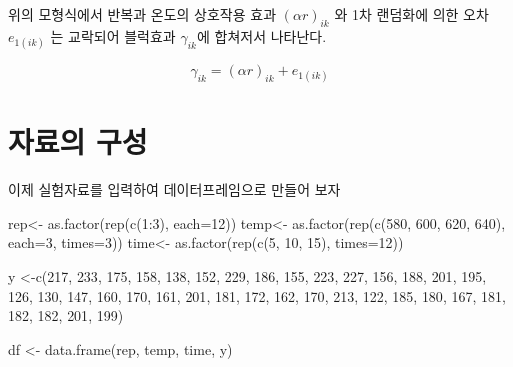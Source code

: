 \documentclass[
]{book}
\newenvironment{Shaded}{\begin{snugshade}}{\end{snugshade}}
\newcommand{\AttributeTok}[1]{\textcolor[rgb]{0.77,0.63,0.00}{#1}}
\newcommand{\DecValTok}[1]{\textcolor[rgb]{0.00,0.00,0.81}{#1}}
\newcommand{\FunctionTok}[1]{\textcolor[rgb]{0.00,0.00,0.00}{#1}}
\newcommand{\NormalTok}[1]{#1}
\newcommand{\OtherTok}[1]{\textcolor[rgb]{0.56,0.35,0.01}{#1}}
\newcommand{\SpecialCharTok}[1]{\textcolor[rgb]{0.00,0.00,0.00}{#1}}
\begin{document}
위의 모형식에서 반복과 온도의 상호작용 효과 \(( \alpha r)_{ik}\) 와 1차 랜덤화에 의한 오차 \(e_{1(ik)}\) 는 교락되어
블럭효과 \(\gamma_{ik}\)에 합쳐저서 나타난다.

\[ \gamma_{ik}  =  (\alpha r)_{ik} + e_{1(ik)}  \]

\hypertarget{uxc790uxb8ccuxc758-uxad6cuxc131-3}{%
\section{자료의 구성}\label{uxc790uxb8ccuxc758-uxad6cuxc131-3}}

이제 실험자료를 입력하여 데이터프레임으로 만들어 보자

\begin{Shaded}
\begin{Highlighting}[]
\NormalTok{rep}\OtherTok{\textless{}{-}} \FunctionTok{as.factor}\NormalTok{(}\FunctionTok{rep}\NormalTok{(}\FunctionTok{c}\NormalTok{(}\DecValTok{1}\SpecialCharTok{:}\DecValTok{3}\NormalTok{), }\AttributeTok{each=}\DecValTok{12}\NormalTok{))}
\NormalTok{temp}\OtherTok{\textless{}{-}} \FunctionTok{as.factor}\NormalTok{(}\FunctionTok{rep}\NormalTok{(}\FunctionTok{c}\NormalTok{(}\DecValTok{580}\NormalTok{, }\DecValTok{600}\NormalTok{, }\DecValTok{620}\NormalTok{, }\DecValTok{640}\NormalTok{), }\AttributeTok{each=}\DecValTok{3}\NormalTok{, }\AttributeTok{times=}\DecValTok{3}\NormalTok{))}
\NormalTok{time}\OtherTok{\textless{}{-}} \FunctionTok{as.factor}\NormalTok{(}\FunctionTok{rep}\NormalTok{(}\FunctionTok{c}\NormalTok{(}\DecValTok{5}\NormalTok{, }\DecValTok{10}\NormalTok{, }\DecValTok{15}\NormalTok{), }\AttributeTok{times=}\DecValTok{12}\NormalTok{))}

\NormalTok{y }\OtherTok{\textless{}{-}}\FunctionTok{c}\NormalTok{(}\DecValTok{217}\NormalTok{, }\DecValTok{233}\NormalTok{, }\DecValTok{175}\NormalTok{, }\DecValTok{158}\NormalTok{, }\DecValTok{138}\NormalTok{, }\DecValTok{152}\NormalTok{, }\DecValTok{229}\NormalTok{, }\DecValTok{186}\NormalTok{, }\DecValTok{155}\NormalTok{, }\DecValTok{223}\NormalTok{, }\DecValTok{227}\NormalTok{, }\DecValTok{156}\NormalTok{,}
        \DecValTok{188}\NormalTok{, }\DecValTok{201}\NormalTok{, }\DecValTok{195}\NormalTok{, }\DecValTok{126}\NormalTok{, }\DecValTok{130}\NormalTok{, }\DecValTok{147}\NormalTok{, }\DecValTok{160}\NormalTok{, }\DecValTok{170}\NormalTok{, }\DecValTok{161}\NormalTok{, }\DecValTok{201}\NormalTok{, }\DecValTok{181}\NormalTok{, }\DecValTok{172}\NormalTok{,}
        \DecValTok{162}\NormalTok{, }\DecValTok{170}\NormalTok{, }\DecValTok{213}\NormalTok{, }\DecValTok{122}\NormalTok{, }\DecValTok{185}\NormalTok{, }\DecValTok{180}\NormalTok{, }\DecValTok{167}\NormalTok{, }\DecValTok{181}\NormalTok{, }\DecValTok{182}\NormalTok{, }\DecValTok{182}\NormalTok{, }\DecValTok{201}\NormalTok{, }\DecValTok{199}\NormalTok{) }

\NormalTok{df }\OtherTok{\textless{}{-}} \FunctionTok{data.frame}\NormalTok{(rep, temp, time, y)}
\end{Highlighting}
\end{Shaded}
\end{document}
